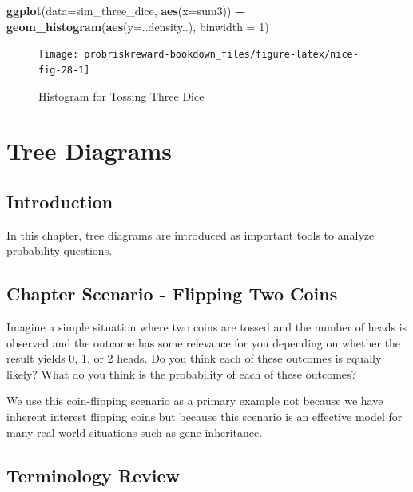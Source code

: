 \documentclass[]{book}
\newenvironment{Shaded}{\begin{snugshade}}{\end{snugshade}}
\newcommand{\KeywordTok}[1]{\textcolor[rgb]{0.13,0.29,0.53}{\textbf{#1}}}
\newcommand{\DataTypeTok}[1]{\textcolor[rgb]{0.13,0.29,0.53}{#1}}
\newcommand{\DecValTok}[1]{\textcolor[rgb]{0.00,0.00,0.81}{#1}}
\newcommand{\StringTok}[1]{\textcolor[rgb]{0.31,0.60,0.02}{#1}}
\newcommand{\OperatorTok}[1]{\textcolor[rgb]{0.81,0.36,0.00}{\textbf{#1}}}
\newcommand{\NormalTok}[1]{#1}
\theoremstyle{definition}
\theoremstyle{definition}
\theoremstyle{definition}
\theoremstyle{remark}
\begin{document}
\begin{Shaded}
\begin{Highlighting}[]
\KeywordTok{ggplot}\NormalTok{(}\DataTypeTok{data=}\NormalTok{sim_three_dice, }\KeywordTok{aes}\NormalTok{(}\DataTypeTok{x=}\NormalTok{sum3)) }\OperatorTok{+}\StringTok{ }\KeywordTok{geom_histogram}\NormalTok{(}\KeywordTok{aes}\NormalTok{(}\DataTypeTok{y=}\NormalTok{..density..), }\DataTypeTok{binwidth =} \DecValTok{1}\NormalTok{)}
\end{Highlighting}
\end{Shaded}

\begin{figure}

{\centering \texttt{[image: probriskreward-bookdown\_files/figure-latex/nice-fig-28-1]} 

}

\caption{Histogram for Tossing Three Dice}\label{fig:nice-fig-28}
\end{figure}

\chapter{Tree Diagrams}\label{trees}

\section{Introduction}\label{introduction}

In this chapter, tree diagrams are introduced as important tools to
analyze probability questions.

\section{Chapter Scenario - Flipping Two Coins}\label{chapter_scenario}

Imagine a simple situation where two coins are tossed and the number of
heads is observed and the outcome has some relevance for you depending
on whether the result yields 0, 1, or 2 heads. Do you think each of
these outcomes is equally likely? What do you think is the probability
of each of these outcomes?

We use this coin-flipping scenario as a primary example not because we
have inherent interest flipping coins but because this scenario is an
effective model for many real-world situations such as gene inheritance.

\section{Terminology Review}\label{terminology_review}
\end{document}

